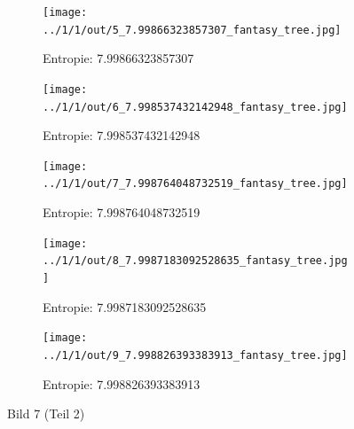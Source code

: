 \begin{figure}
	\centering

	\begin{subfigure}{0.25\textwidth}
		\texttt{[image: ../1/1/out/5\_7.99866323857307\_fantasy\_tree.jpg]}
		\caption{Entropie: 7.99866323857307}
	\end{subfigure}

	\begin{subfigure}{0.25\textwidth}
		\texttt{[image: ../1/1/out/6\_7.998537432142948\_fantasy\_tree.jpg]}
		\caption{Entropie: 7.998537432142948}
	\end{subfigure}

	\begin{subfigure}{0.25\textwidth}
		\texttt{[image: ../1/1/out/7\_7.998764048732519\_fantasy\_tree.jpg]}
		\caption{Entropie: 7.998764048732519}
	\end{subfigure}

	\begin{subfigure}{0.25\textwidth}
		\texttt{[image: ../1/1/out/8\_7.9987183092528635\_fantasy\_tree.jpg]}
		\caption{Entropie: 7.9987183092528635}
	\end{subfigure}

	\begin{subfigure}{0.25\textwidth}
		\texttt{[image: ../1/1/out/9\_7.998826393383913\_fantasy\_tree.jpg]}
		\caption{Entropie: 7.998826393383913}
	\end{subfigure}

	\caption{Bild 7 (Teil 2)}
\end{figure}

